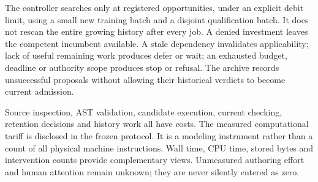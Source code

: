 The controller searches only at registered opportunities, under an explicit debit limit, using a small new training batch and a disjoint qualification batch. It does not rescan the entire growing history after every job. A denied investment leaves the competent incumbent available. A stale dependency invalidates applicability; lack of useful remaining work produces defer or wait; an exhausted budget, deadline or authority scope produces stop or refusal. The archive records unsuccessful proposals without allowing their historical verdicts to become current admission.

Source inspection, AST validation, candidate execution, current checking, retention decisions and history work all have costs. The measured computational tariff is disclosed in the frozen protocol. It is a modeling instrument rather than a count of all physical machine instructions. Wall time, CPU time, stored bytes and intervention counts provide complementary views. Unmeasured authoring effort and human attention remain unknown; they are never silently entered as zero.

